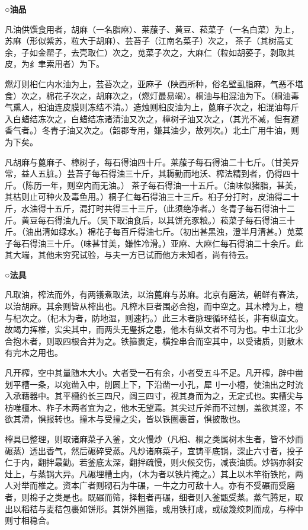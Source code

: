 \documentclass[]{article}
\begin{document}
\textbf{○油品}

凡油供馔食用者，胡麻（一名脂麻）、莱菔子、黄豆、菘菜子（一名白菜）为上，苏麻（形似紫苏，粒大于胡麻）、芸苔子（江南名菜子）次之，茶子（其树高丈余，子如金罂子，去壳取仁）次之，苋菜子次之，大麻仁（粒如胡荽子，剥取其皮，为纟聿索用者）为下。

燃灯则桕仁内水油为上，芸苔次之，亚麻子（陕西所种，俗名壁虱脂麻，气恶不堪食）次之，棉花子次之，胡麻次之，（燃灯最易竭）。桐油与桕混油为下。（桐油毒气熏人，桕油连皮膜则冻结不清。）造烛则桕皮油为上，蓖麻子次之，桕混油每斤入白蜡结冻次之，白蜡结冻诸清油又次之，樟树子油又次之，（其光不减，但有避香气者。）冬青子油又次之。（韶郡专用，嫌其油少，故列次。）北土广用牛油，则为下矣。

凡胡麻与蓖麻子、樟树子，每石得油四十斤。莱菔子每石得油二十七斤。（甘美异常，益人五脏。）芸苔子每石得油三十斤，其耨勤而地沃、榨法精到者，仍得四十斤。（陈历一年，则空内而无油。）茶子每石得油一十五斤。（油味似猪脂，甚美，其枯则止可种火及毒鱼用。）桐子仁每石得油三十三斤。桕子分打时，皮油得二十斤，水油得十五斤，混打时共得三十三斤，（此须绝净者。）冬青子每石得油十二斤。黄豆每石得油九斤。（吴下取油食后，以其饼充豕粮。）菘菜子每石得油三十斤。（油出清如绿水。）棉花子每百斤得油七斤。（初出甚黑浊，澄半月清甚。）苋菜子每石得油三十斤。（味甚甘美，嫌性冷滑。）亚麻、大麻仁每石得油二十余斤。此其大端，其他未穷究试验，与夫一方已试而他方未知者，尚有待云。

\textbf{○法具}

凡取油，榨法而外，有两镬煮取法，以治蓖麻与苏麻。北京有磨法，朝鲜有舂法，以治胡麻。其余则皆从榨出也。凡榨木巨者围必合抱，而中空之。其木樟为上，檀与杞次之。（杞木为者，防地湿，则速朽。）此三木者脉理循环结长，非有纵直文。故竭力挥椎，实尖其中，而两头无璺拆之患，他木有纵文者不可为也。中土江北少合抱木者，则取四根合并为之。铁箍裹定，横拴串合而空其中，以受诸质，则散木有完木之用也。

凡开榨，空中其量随木大小。大者受一石有余，小者受五斗不足。凡开榨，辟中凿划平槽一条，以宛凿入中，削圆上下，下沿凿一小孔，犀刂一小槽，使油出之时流入承藉器中。其平槽约长三四尺，阔三四寸，视其身而为之，无定式也。实槽尖与枋唯檀木、柞子木两者宜为之，他木无望焉。其尖过斤斧而不过刨，盖欲其涩，不欲其滑，惧报转也。撞木与受撞之尖，皆以铁圈裹首，惧披散也。

榨具已整理，则取诸麻菜子入釜，文火慢炒（凡桕、桐之类属树木生者，皆不炒而碾蒸）透出香气，然后碾碎受蒸。凡炒诸麻菜子，宜铸平底锅，深止六寸者，投子仁于内，翻拌最勤。若釜底太深，翻拌疏慢，则火候交伤，减丧油质。炒锅亦斜安灶上，与蒸锅大异。凡碾埋槽土内，（木为者以铁片掩之。）其上以木竿衔铁陀，两人对举而椎之。资本广者则砌石为牛碾，一牛之力可敌十人。亦有不受碾而受磨者，则棉子之类是也。既碾而筛，择粗者再碾，细者则入釜甑受蒸。蒸气腾足，取出以稻秸与麦秸包裹如饼形。其饼外圈箍，或用铁打成，或破篾绞刺而成，与榨中则寸相稳合。
\end{document}
